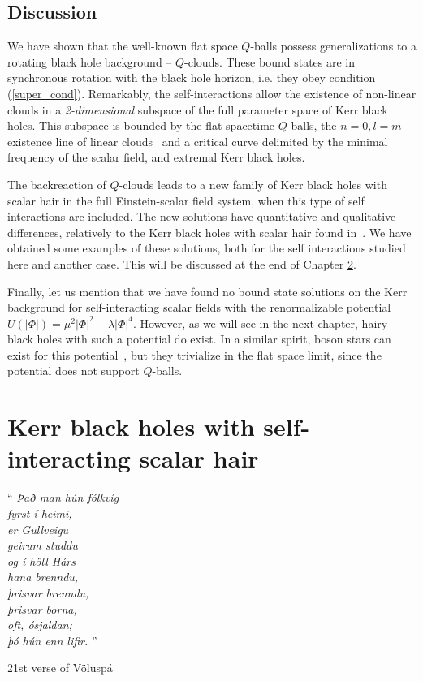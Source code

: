 
 
\section{Discussion} 

We have shown that
the well-known flat space $Q$-balls 
possess generalizations to a rotating black hole background -- $Q$-clouds. These bound states are 
in synchronous rotation with the black hole horizon, i.e. they obey condition (\ref{super_cond}).
Remarkably,
the self-interactions allow the existence of non-linear clouds 
in a \textit{2-dimensional} subspace of the full parameter space of Kerr black holes.
%
This subspace is bounded by the flat spacetime $Q$-balls,
the  $n=0,l=m$ existence line of linear clouds~\cite{Benone:2014ssa}
and a critical curve delimited by the minimal frequency of the scalar field,
and extremal Kerr black holes.
 
The backreaction of $Q$-clouds leads to a new family of Kerr black holes with scalar hair in the full Einstein-scalar field system, when this type of self interactions are included. The new solutions have quantitative and qualitative differences, relatively to the Kerr black holes with scalar hair found in~\cite{Herdeiro:2014goa}. We have obtained some examples of these solutions, both for the self interactions studied here and another case.
This will be discussed at the end of Chapter \ref{ch:SI}.

Finally, let us mention that we have found no bound state solutions on the Kerr background for self-interacting scalar fields with the renormalizable potential $U(|\Phi|) =  \mu^2 |\Phi|^2+\lambda |\Phi|^4$.
However, as we will see in the next chapter, hairy black holes with such a potential do exist.
In a similar spirit,  boson stars can exist for this potential~\cite{Colpi:1986ye,Schunck:2003kk},  but they trivialize in the flat space limit, since the potential does not support $Q$-balls. 
\chapter{Kerr black holes with self-interacting scalar hair}
\label{ch:SI}

\epigraph{``\emph{
Það man hún fólkvíg \\
fyrst í heimi, \\
er Gullveigu \\
geirum studdu \\
og í höll Hárs \\
hana brenndu, \\
þrisvar brenndu, \\
þrisvar borna, \\
oft, ósjaldan; \\
þó hún enn lifir. 
} 
''}{21st verse of Völuspá}


